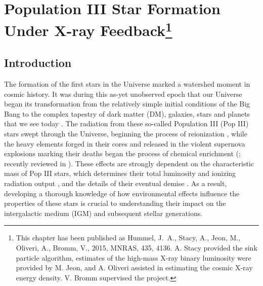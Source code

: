 \documentclass[../thesis.tex]{subfiles}
\begin{document}
\chapter{Population III Star Formation Under X-ray Feedback\footnote{This chapter has been published as Hummel, J.~A., Stacy, A., Jeon, M., Oliveri, A., Bromm, V., 2015, MNRAS, 435, 4136.  A. Stacy provided the sink particle algorithm, estimates of the high-mass X-ray binary luminosity were provided by M. Jeon, and A. Oliveri assisted in estimating the cosmic X-ray energy density. V. Bromm supervised the project.}}
\section{Introduction}
\label{xr_intro}
The formation of the first stars in the Universe marked a watershed moment in cosmic history.  It was during this as-yet unobserved epoch that our Universe began its transformation from the relatively simple initial conditions of the Big Bang to the complex tapestry of dark matter (DM), galaxies, stars and planets that we see today \citep{BarkanaLoeb2001, Miralda-Escude2003, Brommetal2009, Loeb2010}.  The radiation from these so-called Population III (Pop III) stars swept through the Universe, beginning the process of reionization \citep{Kitayamaetal2004, Sokasianetal2004, WhalenAbelNorman2004, AlvarezBrommShapiro2006, JohnsonGreifBromm2007, Robertsonetal2010}, while the heavy elements forged in their cores and released in the violent supernova explosions marking their deaths began the process of chemical enrichment (\citealt{MadauFerraraRees2001, MoriFerraraMadau2002, BrommYoshidaHernquist2003, Hegeretal2003, UmedaNomoto2003, TornatoreFerraraSchneider2007, Greifetal2007, Greifetal2010, WiseAbel2008, Maioetal2011}; recently reviewed in \citealt{KarlssonBrommHawthorn2013}). These effects are strongly dependent on the characteristic mass of Pop III stars, which determines their total luminosity and ionizing radiation output \citep{Schaerer2002}, and the details of their eventual demise \citep{Hegeretal2003, HegerWoosley2010, MaederMeynet2012}. As a result, developing a thorough knowledge of how environmental effects influence the properties of these stars is crucial to understanding their impact on the intergalactic medium (IGM) and subsequent stellar generations.
\end{document}

